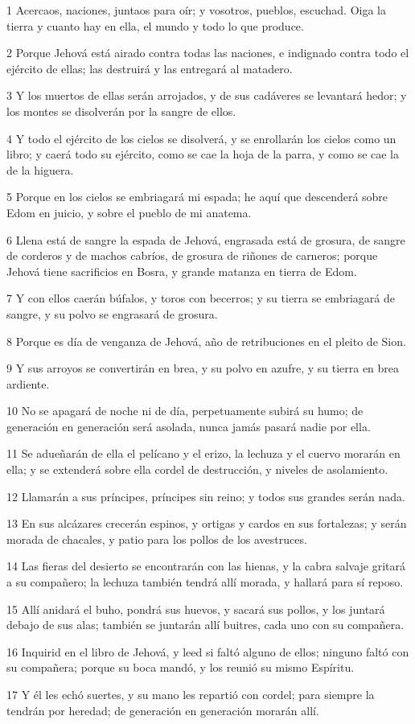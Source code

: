 \par 1 Acercaos, naciones, juntaos para oír; y vosotros, pueblos, escuchad. Oiga la tierra y cuanto hay en ella, el mundo y todo lo que produce.
\par 2 Porque Jehová está airado contra todas las naciones, e indignado contra todo el ejército de ellas; las destruirá y las entregará al matadero.
\par 3 Y los muertos de ellas serán arrojados, y de sus cadáveres se levantará hedor; y los montes se disolverán por la sangre de ellos.
\par 4 Y todo el ejército de los cielos se disolverá, y se enrollarán los cielos como un libro; y caerá todo su ejército, como se cae la hoja de la parra, y como se cae la de la higuera. 
\par 5 Porque en los cielos se embriagará mi espada; he aquí que descenderá sobre Edom en juicio, y sobre el pueblo de mi anatema.
\par 6 Llena está de sangre la espada de Jehová, engrasada está de grosura, de sangre de corderos y de machos cabríos, de grosura de riñones de carneros; porque Jehová tiene sacrificios en Bosra, y grande matanza en tierra de Edom. 
\par 7 Y con ellos caerán búfalos, y toros con becerros; y su tierra se embriagará de sangre, y su polvo se engrasará de grosura.
\par 8 Porque es día de venganza de Jehová, año de retribuciones en el pleito de Sion.
\par 9 Y sus arroyos se convertirán en brea, y su polvo en azufre, y su tierra en brea ardiente.
\par 10 No se apagará de noche ni de día, perpetuamente subirá su humo; de generación en generación será asolada, nunca jamás pasará nadie por ella.
\par 11 Se adueñarán de ella el pelícano y el erizo, la lechuza y el cuervo morarán en ella; y se extenderá sobre ella cordel de destrucción, y niveles de asolamiento. 
\par 12 Llamarán a sus príncipes, príncipes sin reino; y todos sus grandes serán nada.
\par 13 En sus alcázares crecerán espinos, y ortigas y cardos en sus fortalezas; y serán morada de chacales, y patio para los pollos de los avestruces.
\par 14 Las fieras del desierto se encontrarán con las hienas, y la cabra salvaje gritará a su compañero; la lechuza también tendrá allí morada, y hallará para sí reposo.
\par 15 Allí anidará el buho, pondrá sus huevos, y sacará sus pollos, y los juntará debajo de sus alas; también se juntarán allí buitres, cada uno con su compañera.
\par 16 Inquirid en el libro de Jehová, y leed si faltó alguno de ellos; ninguno faltó con su compañera; porque su boca mandó, y los reunió su mismo Espíritu.
\par 17 Y él les echó suertes, y su mano les repartió con cordel; para siempre la tendrán por heredad; de generación en generación morarán allí.

